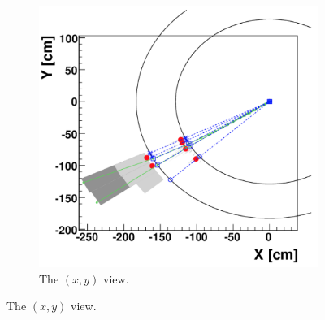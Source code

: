 \begin{figure}
	\centering
	\begin{subfigure}{0.9\textwidth}
		\includegraphics[width=.8\linewidth]{analysis/pics/PF_a.png}
		\caption{The $(x, y)$ view.}
		\label{fig:PF_a}
	\end{subfigure}
	

\end{figure}
